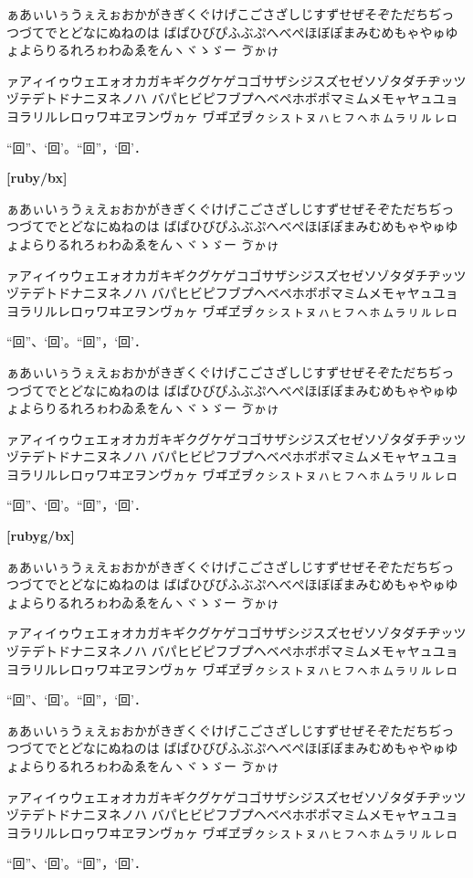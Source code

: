 \documentclass[a4paper,titlepage, draft]{\class}
\begin{document}
{\rubyfamily%
[ruby/m]

ぁあぃいぅうぇえぉおかがきぎくぐけげこごさざしじすずせぜそぞただちぢっつづてでとどなにぬねのは
ばぱひびぴふぶぷへべぺほぼぽまみむめもゃやゅゆょよらりるれろゎわゐゑをんヽヾゝゞー
\ifuptexmode
ゔゕゖ



\fi

ァアィイゥウェエォオカガキギクグケゲコゴサザシジスズセゼソゾタダチヂッツヅテデトドナニヌネノハ
バパヒビピフブプヘベペホボポマミムメモャヤュユョヨラリルレロヮワヰヱヲンヴヵヶ
\ifuptexmode
ヷヸヹヺㇰㇱㇲㇳㇴㇵㇶㇷㇸㇹㇺㇻㇼㇽㇾㇿ
\fi

“回”、‘回’。“回”，‘回’．

{\bfseries%
[ruby/bx]

ぁあぃいぅうぇえぉおかがきぎくぐけげこごさざしじすずせぜそぞただちぢっつづてでとどなにぬねのは
ばぱひびぴふぶぷへべぺほぼぽまみむめもゃやゅゆょよらりるれろゎわゐゑをんヽヾゝゞー
\ifuptexmode
ゔゕゖ
\fi

ァアィイゥウェエォオカガキギクグケゲコゴサザシジスズセゼソゾタダチヂッツヅテデトドナニヌネノハ
バパヒビピフブプヘベペホボポマミムメモャヤュユョヨラリルレロヮワヰヱヲンヴヵヶ
\ifuptexmode
ヷヸヹヺㇰㇱㇲㇳㇴㇵㇶㇷㇸㇹㇺㇻㇼㇽㇾㇿ
\fi

“回”、‘回’。“回”，‘回’．
}}

{\gtfamily\rubyfamily%
[rubyg/m]

ぁあぃいぅうぇえぉおかがきぎくぐけげこごさざしじすずせぜそぞただちぢっつづてでとどなにぬねのは
ばぱひびぴふぶぷへべぺほぼぽまみむめもゃやゅゆょよらりるれろゎわゐゑをんヽヾゝゞー
\ifuptexmode
ゔゕゖ
\fi

ァアィイゥウェエォオカガキギクグケゲコゴサザシジスズセゼソゾタダチヂッツヅテデトドナニヌネノハ
バパヒビピフブプヘベペホボポマミムメモャヤュユョヨラリルレロヮワヰヱヲンヴヵヶ
\ifuptexmode
ヷヸヹヺㇰㇱㇲㇳㇴㇵㇶㇷㇸㇹㇺㇻㇼㇽㇾㇿ
\fi

“回”、‘回’。“回”，‘回’．

{\gtfamily\rubyfamily\bfseries%
[rubyg/bx]



ぁあぃいぅうぇえぉおかがきぎくぐけげこごさざしじすずせぜそぞただちぢっつづてでとどなにぬねのは
ばぱひびぴふぶぷへべぺほぼぽまみむめもゃやゅゆょよらりるれろゎわゐゑをんヽヾゝゞー
\ifuptexmode
ゔゕゖ
\fi

ァアィイゥウェエォオカガキギクグケゲコゴサザシジスズセゼソゾタダチヂッツヅテデトドナニヌネノハ
バパヒビピフブプヘベペホボポマミムメモャヤュユョヨラリルレロヮワヰヱヲンヴヵヶ
\ifuptexmode
ヷヸヹヺㇰㇱㇲㇳㇴㇵㇶㇷㇸㇹㇺㇻㇼㇽㇾㇿ
\fi

“回”、‘回’。“回”，‘回’．
}}

{\mgfamily\rubyfamily%
[rubymg/m]

ぁあぃいぅうぇえぉおかがきぎくぐけげこごさざしじすずせぜそぞただちぢっつづてでとどなにぬねのは
ばぱひびぴふぶぷへべぺほぼぽまみむめもゃやゅゆょよらりるれろゎわゐゑをんヽヾゝゞー
\ifuptexmode
ゔゕゖ
\fi

ァアィイゥウェエォオカガキギクグケゲコゴサザシジスズセゼソゾタダチヂッツヅテデトドナニヌネノハ
バパヒビピフブプヘベペホボポマミムメモャヤュユョヨラリルレロヮワヰヱヲンヴヵヶ
\ifuptexmode
ヷヸヹヺㇰㇱㇲㇳㇴㇵㇶㇷㇸㇹㇺㇻㇼㇽㇾㇿ
\fi

“回”、‘回’。“回”，‘回’．
}
\end{document}
